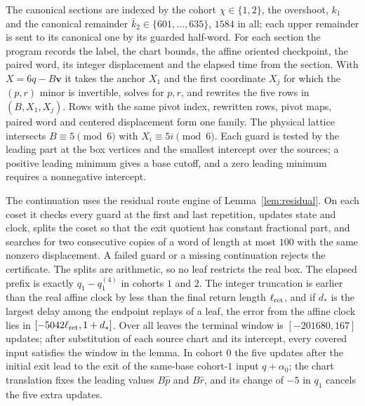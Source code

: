 \documentclass[11pt,reqno]{amsart}
\theoremstyle{remark}
\newcommand{\vct}{\boldsymbol v}
\begin{document}
The canonical sections are indexed by the cohort \(\chi\in\{1,2\}\), the overshoot, \(k_1\) and the canonical remainder \(\bar k_2\in\{601,\ldots,635\}\), \(1584\) in all; each upper remainder is sent to its canonical one by its guarded half-word. For each section the program records the label, the chart bounds, the affine oriented checkpoint, the paired word, its integer displacement and the elapsed time from the section. With \(X=6q-B\vct\) it takes the anchor \(X_1\) and the first coordinate \(X_j\) for which the \((p,r)\) minor is invertible, solves for \(p,r\), and rewrites the five rows in \((B,X_1,X_j)\). Rows with the same pivot index, rewritten rows, pivot maps, paired word and centered displacement form one family. The physical lattice intersects \(B\equiv5\pmod6\) with \(X_i\equiv5i\pmod6\). Each guard is tested by the leading part at the box vertices and the smallest intercept over the sources; a positive leading minimum gives a base cutoff, and a zero leading minimum requires a nonnegative intercept.

The continuation uses the residual route engine of Lemma~\ref{lem:residual}. On each coset it checks every guard at the first and last repetition, updates state and clock, splits the coset so that the exit quotient has constant fractional part, and searches for two consecutive copies of a word of length at most \(100\) with the same nonzero displacement. A failed guard or a missing continuation rejects the certificate. The splits are arithmetic, so no leaf restricts the real box. The elapsed prefix is exactly \(q_1-q^{(4)}_1\) in cohorts \(1\) and \(2\). The integer truncation is earlier than the real affine clock by less than the final return length \(\ell_{\rm ret}\), and if \(d_*\) is the largest delay among the endpoint replays of a leaf, the error from the affine clock lies in \([-5042\ell_{\rm ret},1+d_*]\). Over all leaves the terminal window is \([-201680,167]\) updates; after substitution of each source chart and its intercept, every covered input satisfies the window in the lemma. In cohort \(0\) the five updates after the initial exit lead to the exit of the same-base cohort-\(1\) input \(q+\alpha_0\); the chart translation fixes the leading values \(B\hat p\) and \(B\hat r\), and its change of \(-5\) in \(q_1\) cancels the five extra updates.
\end{document}
